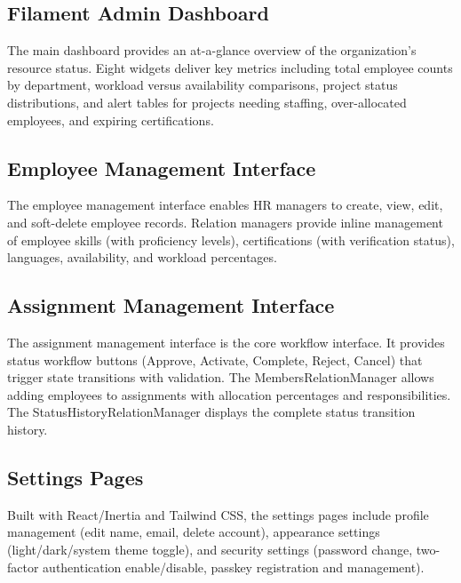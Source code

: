 \documentclass{bts-report}
\begin{document}
\subsection{Filament Admin Dashboard}
The main dashboard provides an at-a-glance overview of the organization's resource status. Eight widgets deliver key metrics including total employee counts by department, workload versus availability comparisons, project status distributions, and alert tables for projects needing staffing, over-allocated employees, and expiring certifications.


\subsection{Employee Management Interface}
The employee management interface enables HR managers to create, view, edit, and soft-delete employee records. Relation managers provide inline management of employee skills (with proficiency levels), certifications (with verification status), languages, availability, and workload percentages.


\subsection{Assignment Management Interface}
The assignment management interface is the core workflow interface. It provides status workflow buttons (Approve, Activate, Complete, Reject, Cancel) that trigger state transitions with validation. The MembersRelationManager allows adding employees to assignments with allocation percentages and responsibilities. The StatusHistoryRelationManager displays the complete status transition history.


\subsection{Settings Pages}
Built with React/Inertia and Tailwind CSS, the settings pages include profile management (edit name, email, delete account), appearance settings (light/dark/system theme toggle), and security settings (password change, two-factor authentication enable/disable, passkey registration and management).
\end{document}
